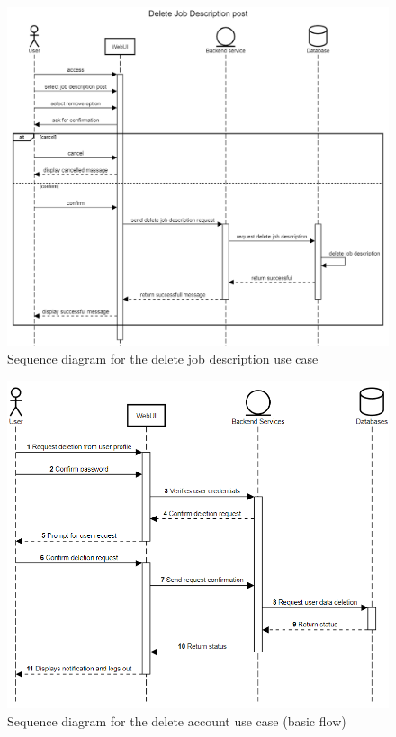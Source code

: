 \documentclass[a4paper]{article}
\begin{document}
    \begin{figure}[H]
        \centering
        \includegraphics[width=1.0\textwidth]{Delete job description post.png}
        \caption{Sequence diagram for the delete job description use case}
        \label{fig:fig16}
    \end{figure}

    \begin{figure}[H]
        \centering
        \includegraphics[width=1.0\textwidth]{delete_account.png}
        \caption{Sequence diagram for the delete account use case (basic flow)}
        \label{fig:fig17}
    \end{figure}
\end{document}
